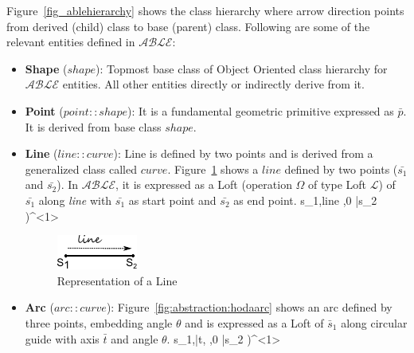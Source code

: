 Figure~\ref{fig_ablehierarchy} shows the class hierarchy where arrow direction points from derived (child) class to base (parent) class.
Following are some of the relevant entities defined in $\mathcal{ABLE}$:

\begin{itemize}[noitemsep,topsep=2pt,parsep=2pt,partopsep=2pt]

\item {\bf Shape} ($shape$): Topmost base class of Object Oriented class hierarchy for $\mathcal{ABLE}$ entities. All other entities directly or indirectly derive from it. 


\item {\bf Point} ($point::shape$): It is a fundamental geometric primitive expressed as $\bar{p}$. 	It is derived from base class $shape$.

\item {\bf Line} ($line::curve$): Line is defined by two points and is derived from a generalized class called $curve$. Figure~\ref{fig:abstraction:hodaline} shows a $line$ defined by two points ($\bar{s_1}$ and $\bar{s_2}$). In $\mathcal{ABLE}$, it is expressed as a Loft (operation $\Omega$ of type Loft $\mathcal{L}$) of $\bar{s_1}$ along {\em line} with $\bar{s_1}$ as start point and $\bar{s_2}$ as end point.   {s_1,line ,0} {\bar{s_2} )^{<1>} }	

\smallskip

\begin{figure}[!h]
\centering 
\includegraphics[width=0.2\linewidth]{images/hodaline.pdf} 
\caption{Representation of a Line}
\label{fig:abstraction:hodaline}
\end{figure}

\smallskip



\item  {\bf Arc} ($arc::curve$):  Figure~\ref{fig:abstraction:hodaarc} shows an arc defined by three points, embedding angle $\theta$ and is expressed as a Loft of $\bar{s}_1$ along circular guide with axis $\bar{t}$ and angle $\theta$.  {s_1,\bar{t}, \theta,0} {\bar{s_2} )^{<1>}}	


\end{itemize}
